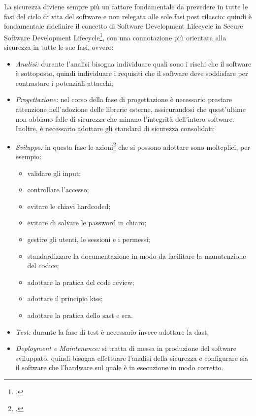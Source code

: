 La sicurezza diviene sempre più un fattore fondamentale da prevedere in tutte le fasi del ciclo di vita del software e non relegata alle sole fasi post rilascio: quindi è fondamentale ridefinire il concetto di Software Development Lifecycle in Secure Software Development Lifecycle\footcite{site:ssdl}, con una connotazione più orientata alla sicurezza in tutte le sue fasi, ovvero:
\begin{itemize}
    \item \textit{Analisi:} durante l'analisi bisogna individuare quali sono i rischi che il software è sottoposto, quindi individuare i requisiti che il software deve soddisfare per contrastare i potenziali attacchi;
    \item \textit{Progettazione:} nel corso della fase di progettazione è necessario prestare attenzione nell'adozione delle librerie esterne, assicurandosi che quest'ultime non abbiano falle di sicurezza che minano l'integrità dell'intero software.
    Inoltre, è necessario adottare gli standard di sicurezza consolidati;
    \item \textit{Sviluppo:} in questa fase le azioni\footcite{site:security-best-practice} che si possono adottare sono molteplici, per esempio:
    \begin{itemize}
        \item validare gli input;
        \item controllare l'accesso;
        \item evitare le chiavi hardcoded;
        \item evitare di salvare le password in chiaro;
        \item gestire gli utenti, le sessioni e i permessi;
        \item standardizzare la documentazione in modo da facilitare la manutenzione del codice;
        \item adottare la pratica del code review;
        \item adottare il principio \gls{kiss};
        \item adottare la pratica dello \gls{sast} e \gls{sca}.
    \end{itemize}
    \item \textit{Test:} durante la fase di test è necessario invece adottare la \gls{dast};
    \item \textit{Deployment e Maintenance:} si tratta di messa in produzione del software sviluppato, quindi bisogna effettuare l'analisi della sicurezza e configurare sia il software che l'hardware sul quale è in esecuzione in modo corretto.
\end{itemize}

